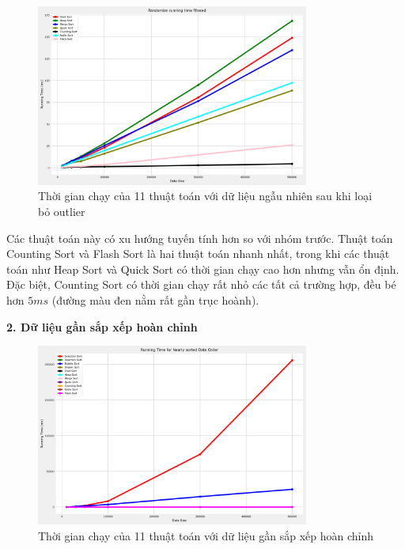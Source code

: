 \begin{figure}[H]
    \centering
    \includegraphics[width=0.8\textwidth]{exprimental_result/images/randomize_running_time_filtered.png}
    \caption{Thời gian chạy của 11 thuật toán với dữ liệu ngẫu nhiên sau khi loại bỏ outlier}
    \label{fig:randomize_running_time_filtered}
\end{figure}

Các thuật toán này có xu hướng tuyến tính hơn so với nhóm trước. Thuật toán Counting Sort và Flash Sort là hai thuật toán nhanh nhất, trong khi các thuật toán như Heap Sort và Quick Sort có thời gian chạy cao hơn nhưng vẫn ổn định. Đặc biệt, Counting Sort có thời gian chạy rất nhỏ các tất cả trường hợp, đều bé hơn $5 ms$ (đường màu đen nằm rất gần trục hoành).


\textbf{2. Dữ liệu gần sắp xếp hoàn chỉnh}

\begin{figure}[H]
    \centering
    \includegraphics[width=0.8\textwidth]{exprimental_result/images/nearly_sorted_running_time.png}
    \caption{Thời gian chạy của 11 thuật toán với dữ liệu gần sắp xếp hoàn chỉnh}
    \label{fig:nearly_sorted_running_time}
\end{figure}


